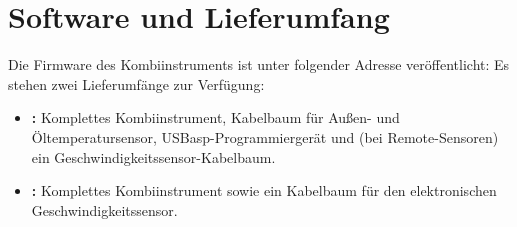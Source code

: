 \section{Software und Lieferumfang}
Die Firmware des Kombiinstruments ist unter folgender Adresse veröffentlicht:
Es stehen zwei Lieferumfänge zur Verfügung:
\begin{itemize}
    \item \textbf{\ReplicaGenOne{}:} Komplettes Kombiinstrument, Kabelbaum für Außen- und Öltemperatursensor, USBasp-Programmiergerät und (bei Remote-Sensoren) ein Geschwindigkeitssensor-Kabelbaum.
    \item \textbf{\ReplicaNextLong{}:} Komplettes Kombiinstrument sowie ein Kabelbaum für den elektronischen Geschwindigkeitssensor.
\end{itemize}
